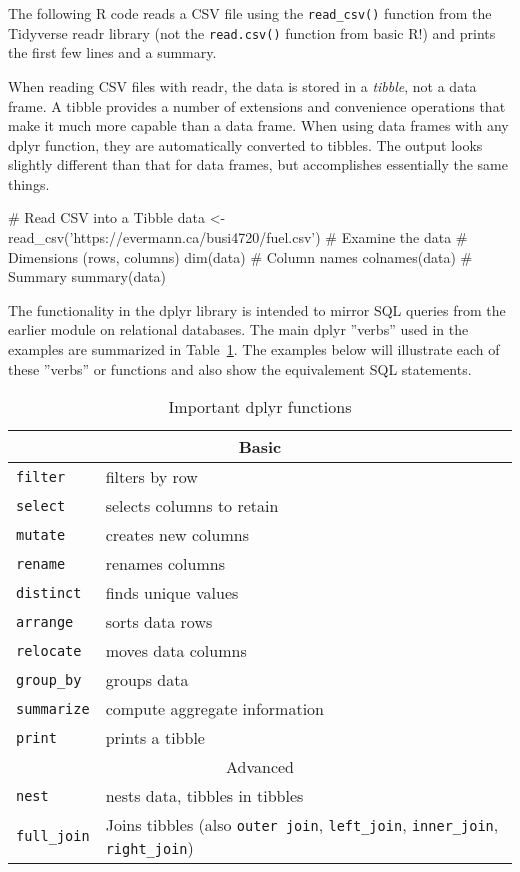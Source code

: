 The following R code reads a CSV file using the \texttt{read\_csv()} function from the Tidyverse readr library (not the \texttt{read.csv()} function from basic R!) and prints the first few lines and a summary. 

When reading CSV files with readr, the data is stored in a \emph{tibble}, not a data frame. A tibble provides a number of extensions and convenience operations that make it much more capable than a data frame. When using data frames with any dplyr function, they are automatically converted to tibbles. The output looks slightly different than that for data frames, but accomplishes essentially the same things.

\begin{samepage}
\begin{Rcode}
# Read CSV into a Tibble
data <- read_csv('https://evermann.ca/busi4720/fuel.csv')
# Examine the data
# Dimensions (rows, columns)
dim(data)
# Column names
colnames(data)
# Summary
summary(data)
\end{Rcode}
\end{samepage}

The functionality in the dplyr library is intended to mirror SQL queries from the earlier module on relational databases. The main dplyr ''verbs'' used in the examples are summarized in Table~\ref{tab:dplyr}. The examples below will illustrate each of these ''verbs'' or functions and also show the equivalement SQL statements. 

\begin{table}
\centering
\renewcommand{\arraystretch}{1.25}

\begin{tabularx}{\textwidth}{l|X} \hline
\multicolumn{2}{c}{Basic} \\ \hline
\texttt{filter} & filters by row \\
\texttt{select} & selects columns to retain \\
\texttt{mutate} & creates new columns \\
\texttt{rename} & renames columns \\
\texttt{distinct} & finds unique values \\
\texttt{arrange} & sorts data rows \\
\texttt{relocate} & moves data columns \\
\texttt{group\_by} & groups data \\
\texttt{summarize} & compute aggregate information \\
\texttt{print} & prints a tibble \\  \hline
\multicolumn{2}{c}{Advanced} \\ \hline
\texttt{nest} & nests data, tibbles in tibbles \\
\texttt{full\_join} & Joins tibbles (also \texttt{outer join}, \texttt{left\_join}, \texttt{inner\_join}, \texttt{right\_join}) \\ \hline
\end{tabularx}
\caption{Important dplyr functions}
\label{tab:dplyr}
\end{table}

